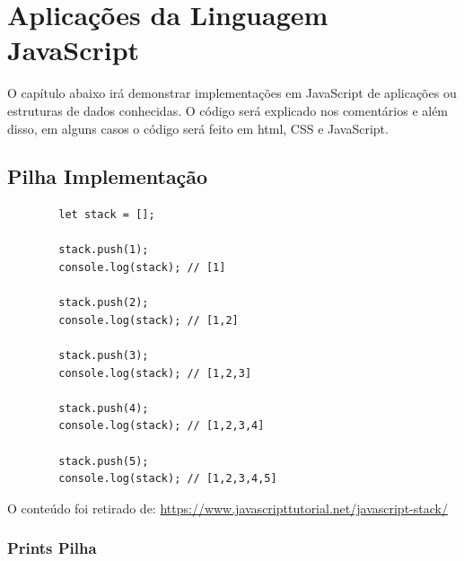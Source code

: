 


\chapter{ Aplica\c{c}\~{o}es da Linguagem JavaScript}

O capítulo abaixo irá demonstrar implementações em JavaScript de aplicações ou estruturas de dados conhecidas. O código será explicado nos comentários e além disso, em alguns casos o código será feito em html, CSS e JavaScript. 


    \section{Pilha Implementação}
    \begin{lstlisting}
    	let stack = [];
    	
    	stack.push(1);
    	console.log(stack); // [1]
    	
    	stack.push(2);
    	console.log(stack); // [1,2]
    	
    	stack.push(3);
    	console.log(stack); // [1,2,3]
    	
    	stack.push(4);
    	console.log(stack); // [1,2,3,4]
    	
    	stack.push(5);
    	console.log(stack); // [1,2,3,4,5]
    \end{lstlisting}
    O conteúdo foi retirado de: \url{https://www.javascripttutorial.net/javascript-stack/}

	\subsection{Prints Pilha}
	
	



